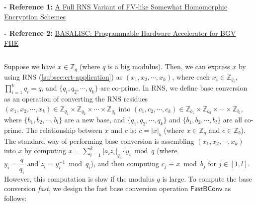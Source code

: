 \noindent \textbf{- Reference 1:} 
\href{https://eprint.iacr.org/2016/510}{A Full RNS Variant of FV-like Somewhat Homomorphic Encryption Schemes}~\cite{rns-bfv}

\noindent \textbf{- Reference 2:} 
\href{https://eprint.iacr.org/2022/657}{BASALISC: Programmable Hardware Accelerator for BGV FHE}~\cite{rns-bfv2}

$ $


Suppose we have $x \in \mathbb{Z}_q$ (where $q$ is a big modulus). Then, we can express $x$ by using RNS (\autoref{subsec:crt-application}) as $(x_1, x_2, \cdots, x_k)$, where each $x_i \in \mathbb{Z}_{q_i}$, $\prod\limits_{i=1}^k q_i = q$, and $\{q_i, q_2, \cdots, q_k\}$ are co-prime. In RNS, we define base conversion as an operation of converting the RNS residues $(x_1, x_2, \cdots, x_k) \in \mathbb{Z}_{q_1} \times \mathbb{Z}_{q_2} \times \cdots \times 
 \mathbb{Z}_{q_k}$ into $(c_1, c_2, \cdots, c_k) \in \mathbb{Z}_{b_1} \times \mathbb{Z}_{b_2} \times \cdots \times \mathbb{Z}_{b_l}$, where $\{b_1, b_2, \cdots, b_l\}$ are a new base, and $\{q_1, q_2, \cdots, q_k\}$ and $\{b_1, b_2, \cdots, b_l\}$ are all co-prime. The relationship between $x$ and $c$ is: $c = |x|_b$ (where $x \in \mathbb{Z}_{q}$ and $c \in \mathbb{Z}_b$). The standard way of performing base conversion is assembling $(x_1, x_2, \cdots, x_k)$ into $x$ by computing $x = \sum\limits_{i=1}^k |a_i z_i|_{q_i} \cdot y_i \bmod q$ (where $y_i = \dfrac{q}{q_i} \text{ and } z_i = y_i^{-1} \bmod q_i$), and then computing $c_j \equiv x \bmod b_j$ for $j \in [1, l]$. However, this computation is slow if the modulus $q$ is large. To compute the base conversion \textit{fast}, we design the fast base conversion operation $\textsf{FastBConv}$ as follows: 


